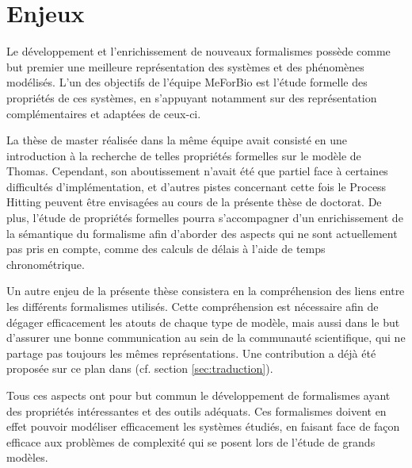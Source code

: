 \section{Enjeux}

Le développement et l'enrichissement de nouveaux formalismes possède comme but premier une meilleure représentation des systèmes et des phénomènes modélisés.
L'un des objectifs de l'équipe MeForBio est l'étude formelle des propriétés de ces systèmes,
en s'appuyant notamment sur des représentation complémentaires et adaptées de ceux-ci.

La thèse de master \cite{Folschette2011} réalisée dans la même équipe avait consisté en une introduction à la recherche de telles propriétés formelles sur le modèle de Thomas.
Cependant, son aboutissement n'avait été que partiel face à certaines difficultés d'implémentation,
et d'autres pistes concernant cette fois le Process Hitting peuvent être envisagées au cours de la présente thèse de doctorat.
De plus, l'étude de propriétés formelles pourra s'accompagner d'un enrichissement de la sémantique du formalisme afin d'aborder des aspects qui ne sont actuellement pas pris en compte, comme des calculs de délais à l'aide de temps chronométrique.


Un autre enjeu de la présente thèse consistera en la compréhension des liens entre les différents formalismes utilisés.
Cette compréhension est nécessaire afin de dégager efficacement les atouts de chaque type de modèle,
mais aussi dans le but d'assurer une bonne communication au sein de la communauté scientifique, qui ne partage pas toujours les mêmes représentations.
Une contribution a déjà été proposée sur ce plan dans \cite{FPIMR12-CMSB} (cf. section \ref{sec:traduction}).

Tous ces aspects ont pour but commun le développement de formalismes ayant des propriétés intéressantes et des outils adéquats.
Ces formalismes doivent en effet pouvoir modéliser efficacement les systèmes étudiés,
en faisant face de façon efficace aux problèmes de complexité qui se posent lors de l'étude de grands modèles.
